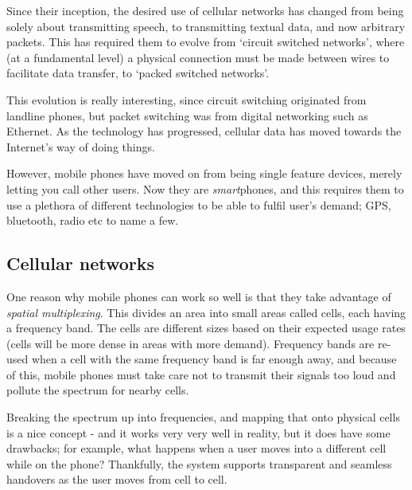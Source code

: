 Since their inception, the desired use of cellular networks has changed from
being solely about transmitting speech, to transmitting textual data, and now
arbitrary packets. This has required them to evolve from `circuit switched
networks', where (at a fundamental level) a physical connection must be made
between wires to facilitate data transfer, to `packed switched networks'.

This evolution is really interesting, since circuit switching originated from
landline phones, but packet switching was from digital networking such as
Ethernet. As the technology has progressed, cellular data has moved towards the
Internet's way of doing things.

However, mobile phones have moved on from being single feature devices, merely
letting you call other users. Now they are \textit{smart}phones, and this
requires them to use a plethora of different technologies to be able to fulfil
user's demand; GPS, bluetooth, radio etc to name a few.

\subsection{Cellular networks}

One reason why mobile phones can work so well is that they take advantage of
\textit{spatial multiplexing}. This divides an area into small areas called
cells, each having a frequency band. The cells are different sizes based on
their expected usage rates (cells will be more dense in areas with more
demand). Frequency bands are re-used when a cell with the same frequency band is
far enough away, and because of this, mobile phones must take care not to
transmit their signals too loud and pollute the spectrum for nearby cells.


Breaking the spectrum up into frequencies, and mapping that onto physical cells
is a nice concept - and it works very very well in reality, but it does have
some drawbacks; for example, what happens when a user moves into a different
cell while on the phone? Thankfully, the system supports transparent and
seamless handovers as the user moves from cell to cell.

